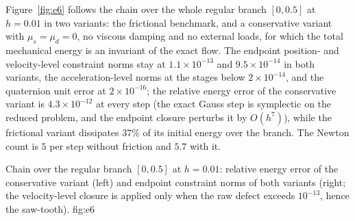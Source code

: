 Figure~\ref{fig:e6} follows the chain over the whole regular branch $[0,0.5]$ at $h=0.01$ in two
variants: the frictional benchmark, and a conservative variant with $\mu_s=\mu_d=0$, no viscous
damping and no external loads, for which the total mechanical energy is an invariant of the exact
flow. The endpoint position- and velocity-level constraint norms stay at $1.1\times10^{-13}$ and
$9.5\times10^{-14}$ in both variants, the acceleration-level norms at the stages below
$2\times10^{-14}$, and the quaternion unit error at $2\times10^{-16}$; the relative energy error of
the conservative variant is $4.3\times10^{-12}$ at every step (the exact Gauss step is symplectic
on the reduced problem, and the endpoint closure perturbs it by $O(h^7)$), while the frictional
variant dissipates $37\%$ of its initial energy over the branch. The Newton count is $5$ per step
without friction and $5.7$ with it.

{Chain over the regular branch $[0,0.5]$ at $h=0.01$: relative energy error of the conservative
variant (left) and endpoint constraint norms of both variants (right; the velocity-level closure is
applied only when the raw defect exceeds $10^{-13}$, hence the saw-tooth).}
{fig:e6}
